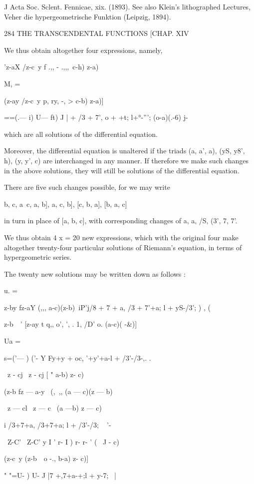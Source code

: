 J Acta Soc. Sclent. Fennicae, xix. (1893). See also Klein's
lithographed Lectures, Veher die hypergeometrische Funktion (Leipzig,
1894).

284 THE TRANSCENDENTAL FUNCTIONS [CHAP. XIV

We thus obtain altogether four expressions, namely,

'z-aX /z-c\ y f .,, - .,,,\ c-h) z-a)\

M, =

(z-ay /z-c\ y p, ry, -, > c-b) z-a)]

 ==(.— i) U— ft) J | + /3 + 7', o + +t; l+°-'''; (o-a)(.-6) j-

which are all solutions of the differential equation.

Moreover, the differential equation is unaltered if the triads (a, a',
a), (yS, y8', h), (y, y', c) are interchanged in any manner. If
therefore we make such changes in the above solutions, they will still
be solutions of the differential equation.

There are five such changes possible, for we may write

 b, c, a\, c, a, b], a, c, b], [c, b, a], [b, a, c]

in turn in place of [a, b, c], with corresponding changes of a, a, /S,
(3', 7, 7'.

We thus obtain 4 x = 20 new expressions, which with the original four
make altogether twenty-four particular solutions of Riemann's
equation, in terms of hypergeometric series.

The twenty new solutions may be written down as follows :

u. =

z-by fz-aY (,,, a-c)(z-b)\ iP'j/8 + 7 + a, /3 + 7'+a; l + yS-/3'; )
, (

z-b\ \ ' [z-ay t q,, o', ', . 1, /D' o. (a-c)( -\&)]

Ua =

 s=('— ) ('- Y Fy+y + oc, '+y'+a-l + /3'-/3-,. .

\ z - cj \ z - cj [ " a-b) z- c)

(z-b fz — a-y \ (, \,,, (a — c)(z — b)

\ z — cl \ z — c \ (a —b) z — c)

i /3+7+a, /3+7+a; l + /3'-/3; ~ '-\

\ Z-C' \ Z-C' y I ' r- I ) r- r- ' ( \ J - c)\

(z-c\ y (z-b\ \, o -., b-a) z- c)]

" "=U- ) U- J |7 +,7+a-+;l + y-7; \; \ |

